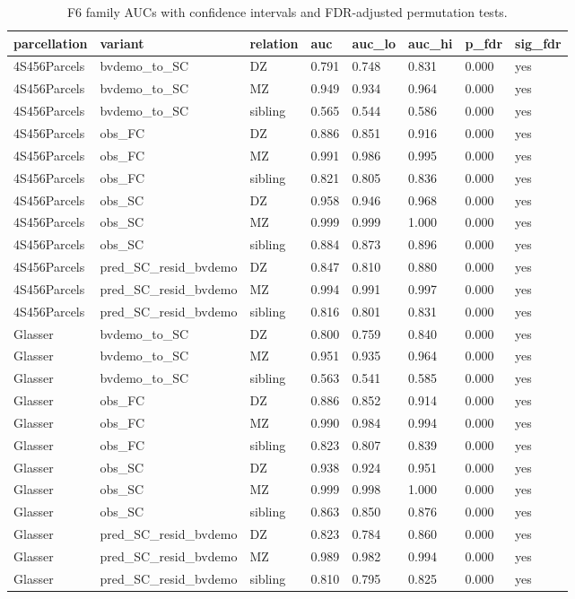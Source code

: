 \documentclass{article}
\begin{document}
\begin{table}[H]
\centering
\scriptsize
\caption{F6 family AUCs with confidence intervals and FDR-adjusted permutation tests.}
\label{tab:f6}
\begin{tabular}{llllllll}
\toprule
parcellation & variant & relation & auc & auc\_lo & auc\_hi & p\_fdr & sig\_fdr \\
\midrule
4S456Parcels & bvdemo\_to\_SC & DZ & 0.791 & 0.748 & 0.831 & 0.000 & yes \\
4S456Parcels & bvdemo\_to\_SC & MZ & 0.949 & 0.934 & 0.964 & 0.000 & yes \\
4S456Parcels & bvdemo\_to\_SC & sibling & 0.565 & 0.544 & 0.586 & 0.000 & yes \\
4S456Parcels & obs\_FC & DZ & 0.886 & 0.851 & 0.916 & 0.000 & yes \\
4S456Parcels & obs\_FC & MZ & 0.991 & 0.986 & 0.995 & 0.000 & yes \\
4S456Parcels & obs\_FC & sibling & 0.821 & 0.805 & 0.836 & 0.000 & yes \\
4S456Parcels & obs\_SC & DZ & 0.958 & 0.946 & 0.968 & 0.000 & yes \\
4S456Parcels & obs\_SC & MZ & 0.999 & 0.999 & 1.000 & 0.000 & yes \\
4S456Parcels & obs\_SC & sibling & 0.884 & 0.873 & 0.896 & 0.000 & yes \\
4S456Parcels & pred\_SC\_resid\_bvdemo & DZ & 0.847 & 0.810 & 0.880 & 0.000 & yes \\
4S456Parcels & pred\_SC\_resid\_bvdemo & MZ & 0.994 & 0.991 & 0.997 & 0.000 & yes \\
4S456Parcels & pred\_SC\_resid\_bvdemo & sibling & 0.816 & 0.801 & 0.831 & 0.000 & yes \\
Glasser & bvdemo\_to\_SC & DZ & 0.800 & 0.759 & 0.840 & 0.000 & yes \\
Glasser & bvdemo\_to\_SC & MZ & 0.951 & 0.935 & 0.964 & 0.000 & yes \\
Glasser & bvdemo\_to\_SC & sibling & 0.563 & 0.541 & 0.585 & 0.000 & yes \\
Glasser & obs\_FC & DZ & 0.886 & 0.852 & 0.914 & 0.000 & yes \\
Glasser & obs\_FC & MZ & 0.990 & 0.984 & 0.994 & 0.000 & yes \\
Glasser & obs\_FC & sibling & 0.823 & 0.807 & 0.839 & 0.000 & yes \\
Glasser & obs\_SC & DZ & 0.938 & 0.924 & 0.951 & 0.000 & yes \\
Glasser & obs\_SC & MZ & 0.999 & 0.998 & 1.000 & 0.000 & yes \\
Glasser & obs\_SC & sibling & 0.863 & 0.850 & 0.876 & 0.000 & yes \\
Glasser & pred\_SC\_resid\_bvdemo & DZ & 0.823 & 0.784 & 0.860 & 0.000 & yes \\
Glasser & pred\_SC\_resid\_bvdemo & MZ & 0.989 & 0.982 & 0.994 & 0.000 & yes \\
Glasser & pred\_SC\_resid\_bvdemo & sibling & 0.810 & 0.795 & 0.825 & 0.000 & yes \\
\bottomrule
\end{tabular}
\end{table}
\end{document}

